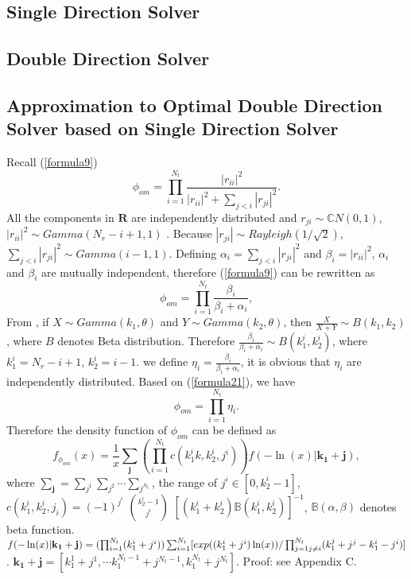 \documentclass[12pt, draftclsnofoot, onecolumn]{IEEEtran}
\begin{document}
\subsection{Single Direction Solver}
\subsection{Double Direction Solver}
\subsection{Approximation to Optimal Double Direction Solver based on Single Direction Solver}
Recall (\ref{formula9})
\begin{equation}
\phi_{om}=\prod_{i=1}^{N_{t}}\frac{|r_{ii}|^{2}}{|r_{ii}|^{2}+\sum_{j<i}|r_{ji}|^{2}}.
\end{equation}
All the components in $\mathbf{R}$ are independently distributed and $r_{ji}\sim \mathbb{C}N(0,1)$, $|r_{ii}|^{2}\sim Gamma(N_{r}-i+1,1)$ \cite{nagar2011expectations}. Because $|r_{ji}|\sim Rayleigh(1/\sqrt{2})$, $\sum_{j<i}|r_{ji}|^{2}\sim Gamma(i-1, 1)$. Defining $\alpha_{i}=\sum_{j<i}|r_{ji}|^{2}$ and $\beta_{i}=|r_{ii}|^{2}$, $\alpha_{i}$ and $\beta_{i}$ are mutually independent, therefore (\ref{formula9}) can be rewritten as 
\begin{equation}
\phi_{om}=\prod_{i=1}^{N_{t}}\frac{\beta_{i}}{\beta_{i}+\alpha_{i}},
\label{formula21}
\end{equation}
From \cite{gupta2004handbook}, if $X\sim Gamma(k_{1},\theta)$ and $Y\sim Gamma(k_{2},\theta)$, then $\frac{X}{X+Y}\sim B(k_{1},k_{2})$, where $B$ denotes Beta distribution. Therefore $\frac{\beta_{i}}{\beta_{i}+\alpha_{i}}\sim B(k^{i}_{1}, k^{i}_{2})$, where $k^{i}_{1}=N_{r}-i+1$, $k^{i}_{2}=i-1$. we define $\eta_{i}=\frac{\beta_{i}}{\beta_{i}+\alpha_{i}}$, it is obvious that $\eta_{i}$ are independently distributed. Based on (\ref{formula21}), we have 
\begin{equation}
\phi_{om}=\prod_{i=1}^{N_{t}}\eta_{i}.
\label{formula22}
\end{equation}
Therefore the density function of $\phi_{om}$ can be defined as
\begin{equation}
f_{\phi_{om}}(x)=\frac{1}{x}\sum_{\mathbf{j}}(\prod_{i=1}^{N_{t}}c(k_{1}^{i}k,k_{2}^{i},j^{i}))f(-\ln(x)|\mathbf{k_{1}}+\mathbf{j}), 
\label{formula23}
\end{equation}
where $\sum_{\mathbf{j}}=\sum_{j^{1}}\sum_{j^{2}}\cdots \sum_{j^{N_{t}}}$, the range of $j^{i}\in [0, k_{2}^{i}-1]$, $c(k_{1}^{i}, k_{2}^{i}, j_{i})=(-1)^{j^{i}}$ $k_{2}^{i}-1\choose j^{i}$ $[(k_{1}^{i}+k_{2}^{i})\mathbb{B}(k_{1}^{i},k_{2}^{i})]^{-1}$, $\mathbb{B}(\alpha, \beta)$ denotes beta function. $f(-\ln(x)|\mathbf{k_{1}}+\mathbf{j})=(\prod_{i=1}^{N_{t}}(k_{1}^{i}+j^{i}))\sum_{i=1}^{N_{t}}[exp((k_{1}^{i}+j^{i})\ln(x))/\prod_{j=1\\ j\neq i}^{N_{t}}(k_{1}^{j}+j^{j}-k_{1}^{i}-j^{i})]$. $\mathbf{k_{1}}+\mathbf{j}=[k_{1}^{1}+j^{1},\cdots k_{1}^{N_{t}-1}+j^{N_{t}-1},k_{1}^{N_{t}}+j^{N_{t}}]$. Proof: see Appendix C. 
\end{document}
